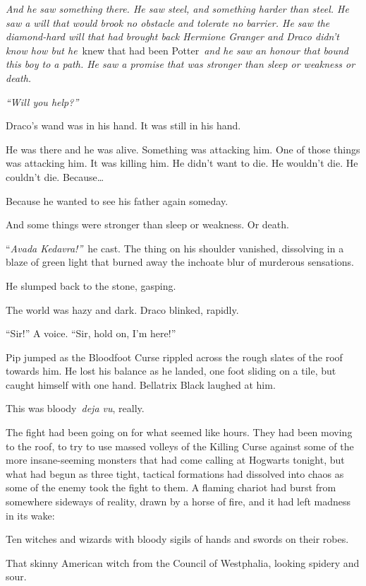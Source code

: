 \emph{And he saw something there. He saw steel, and something harder
than steel. He saw a will that would brook no obstacle and tolerate no
barrier. He saw the diamond-hard will that had brought back Hermione
Granger and Draco didn't know how but he}~knew that had been
Potter~\emph{and he saw an honour that bound this boy to a path. He saw
a promise that was stronger than sleep or weakness or death.}

\emph{``Will you help?''}

Draco's wand was in his hand. It was still in his hand.

He was there and he was alive. Something was attacking him. One of those
things was attacking him. It was killing him. He didn't want to die. He
wouldn't die. He couldn't die. Because\ldots{}

Because he wanted to see his father again someday.

And some things were stronger than sleep or weakness. Or death.

``\emph{Avada Kedavra!''}~he cast. The thing on his shoulder vanished,
dissolving in a blaze of green light that burned away the inchoate blur
of murderous sensations.

He slumped back to the stone, gasping.

The world was hazy and dark. Draco blinked, rapidly.

``Sir!'' A voice. ``Sir, hold on, I'm here!''

\mybreak

Pip jumped as the Bloodfoot Curse rippled across the rough slates of the
roof towards him. He lost his balance as he landed, one foot sliding on
a tile, but caught himself with one hand. Bellatrix Black laughed at
him.

This was bloody~\emph{deja vu}, really.

The fight had been going on for what seemed like hours. They had been
moving to the roof, to try to use massed volleys of the Killing Curse
against some of the more insane-seeming monsters that had come calling
at Hogwarts tonight, but what had begun as three tight, tactical
formations had dissolved into chaos as some of the enemy took the fight
to them. A flaming chariot had burst from somewhere sideways of reality,
drawn by a horse of fire, and it had left madness in its wake:

Ten witches and wizards with bloody sigils of hands and swords on their
robes.

That skinny American witch from the Council of Westphalia, looking
spidery and sour.

